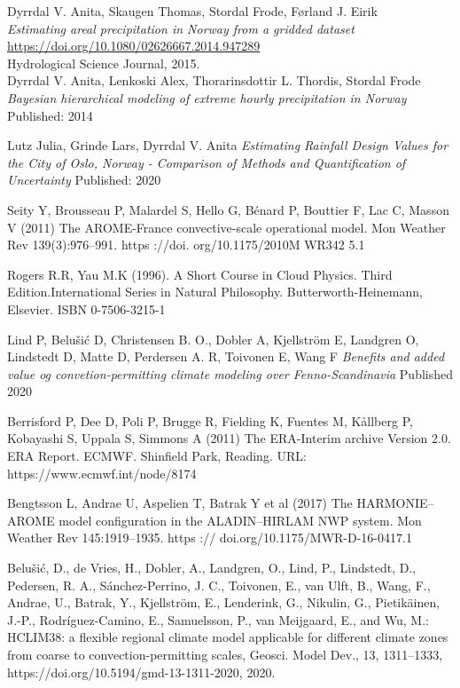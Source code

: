 \begin{thebibliography}{9}

Dyrrdal V. Anita, Skaugen Thomas, Stordal Frode, Førland J. Eirik \\
\textit{Estimating areal precipitation in Norway from a gridded dataset}\\
\url{https://doi.org/10.1080/02626667.2014.947289} \\
Hydrological Science Journal, 2015.\\

Dyrrdal V. Anita, Lenkoski Alex, Thorarinsdottir L. Thordis, Stordal Frode
\textit{Bayesian hierarchical modeling of extreme hourly precipitation in Norway}
Published: 2014

Lutz Julia, Grinde Lars, Dyrrdal V. Anita
\textit{Estimating Rainfall Design Values for the City of Oslo, Norway - Comparison of Methods and Quantification of Uncertainty}
Published: 2020

Seity Y, Brousseau P, Malardel S, Hello G, Bénard P, Bouttier F,
Lac C, Masson V (2011) The AROME-France convective-scale
operational model. Mon Weather Rev 139(3):976–991. https ://doi.
org/10.1175/2010M WR342 5.1

Rogers R.R, Yau M.K (1996). A Short Course in Cloud Physics. Third Edition.International Series in Natural Philosophy.
Butterworth-Heinemann, Elsevier.
ISBN 0-7506-3215-1 

Lind P, Belušić D, Christensen B. O., Dobler A, Kjellström E, Landgren O, Lindstedt D, Matte D, Perdersen A. R, Toivonen E, Wang F
\textit{Benefits and added value og convetion-permitting climate modeling over Fenno-Scandinavia}
Published 2020

Berrisford P, Dee D, Poli P, Brugge R, Fielding K, Fuentes M, Kållberg P, Kobayashi S, Uppala S, Simmons A (2011)
The ERA-Interim archive Version 2.0. ERA Report. ECMWF. Shinfield Park, Reading. URL: https://www.ecmwf.int/node/8174

Bengtsson L, Andrae U, Aspelien T, Batrak Y et al (2017) The HARMONIE–
AROME model configuration in the ALADIN–HIRLAM
NWP system. Mon Weather Rev 145:1919–1935. https ://
doi.org/10.1175/MWR-D-16-0417.1

Belušić, D., de Vries, H., Dobler, A., Landgren, O., Lind, P., Lindstedt, D., Pedersen, R. A., Sánchez-Perrino, J. C., Toivonen, E., van Ulft, B., Wang, F., Andrae, U., Batrak, Y., Kjellström, E., Lenderink, G., Nikulin, G., Pietikäinen, J.-P., Rodríguez-Camino, E., Samuelsson, P., van Meijgaard, E., and Wu, M.: HCLIM38: a flexible regional climate model applicable for different climate zones from coarse to convection-permitting scales, Geosci. Model Dev., 13, 1311–1333, https://doi.org/10.5194/gmd-13-1311-2020, 2020.


\end{thebibliography}
